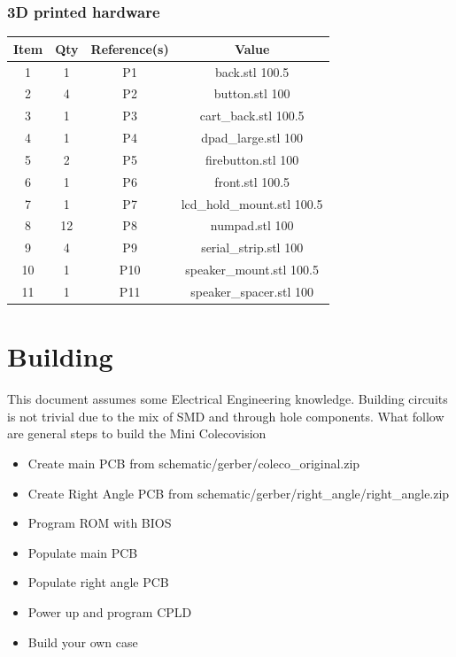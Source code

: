 \subsubsection{3D printed hardware}
\begin{footnotesize}
\begin{longtable}{ |*{4}{c|} }
\hline
{Item} & {Qty} & {Reference(s)} & {Value} \\
\hline
{1} & {1} & {P1} & {back.stl 100.5} \\
\hline
{2} & {4} & {P2} & {button.stl 100} \\
\hline
{3} & {1} & {P3} & {cart\_back.stl 100.5} \\
\hline
{4} & {1} & {P4} & {dpad\_large.stl 100} \\
\hline
{5} & {2} & {P5} & {firebutton.stl 100} \\
\hline
{6} & {1} & {P6} & {front.stl 100.5} \\
\hline
{7} & {1} & {P7} & {lcd\_hold\_mount.stl 100.5} \\
\hline
{8} & {12} & {P8} & {numpad.stl 100} \\
\hline
{9} & {4} & {P9} & {serial\_strip.stl 100} \\
\hline
{10} & {1} & {P10} & {speaker\_mount.stl 100.5} \\
\hline
{11} & {1} & {P11} & {speaker\_spacer.stl 100} \\
\hline
\end{longtable}
\end{footnotesize}

\section{Building}

\par
This document assumes some Electrical Engineering knowledge. Building circuits is not
trivial due to the mix of SMD and through hole components. What follow are general
steps to build the Mini Colecovision

\begin{itemize}
  \item Create main PCB from schematic/gerber/coleco\_original.zip
  \item Create Right Angle PCB from schematic/gerber/right\_angle/right\_angle.zip
  \item Program ROM with BIOS
  \item Populate main PCB
  \item Populate right angle PCB
  \item Power up and program CPLD
  \item Build your own case
\end{itemize}

